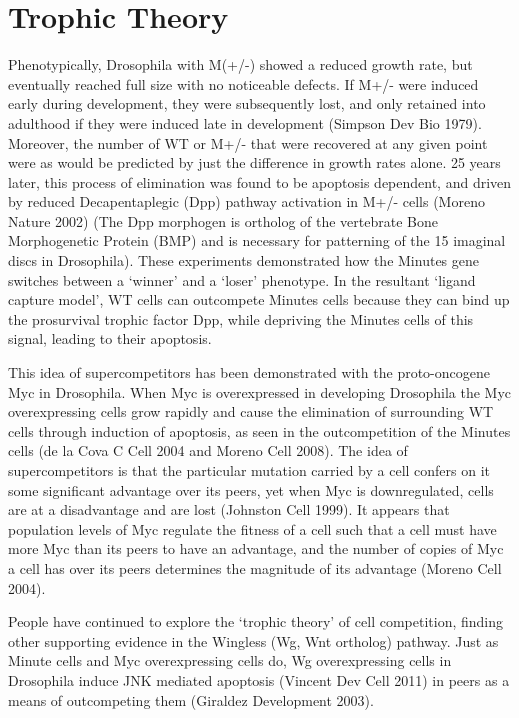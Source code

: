 \documentclass[]{book}
\begin{document}
\section{Trophic Theory}\label{trophic-theory}

Phenotypically, Drosophila with M(+/-) showed a reduced growth rate, but
eventually reached full size with no noticeable defects. If M+/- were
induced early during development, they were subsequently lost, and only
retained into adulthood if they were induced late in development
(Simpson Dev Bio 1979). Moreover, the number of WT or M+/- that were
recovered at any given point were as would be predicted by just the
difference in growth rates alone. 25 years later, this process of
elimination was found to be apoptosis dependent, and driven by reduced
Decapentaplegic (Dpp) pathway activation in M+/- cells (Moreno Nature
2002) (The Dpp morphogen is ortholog of the vertebrate Bone
Morphogenetic Protein (BMP) and is necessary for patterning of the 15
imaginal discs in Drosophila). These experiments demonstrated how the
Minutes gene switches between a `winner' and a `loser' phenotype. In the
resultant `ligand capture model', WT cells can outcompete Minutes cells
because they can bind up the prosurvival trophic factor Dpp, while
depriving the Minutes cells of this signal, leading to their apoptosis.

This idea of supercompetitors has been demonstrated with the
proto-oncogene Myc in Drosophila. When Myc is overexpressed in
developing Drosophila the Myc overexpressing cells grow rapidly and
cause the elimination of surrounding WT cells through induction of
apoptosis, as seen in the outcompetition of the Minutes cells (de la
Cova C Cell 2004 and Moreno Cell 2008). The idea of supercompetitors is
that the particular mutation carried by a cell confers on it some
significant advantage over its peers, yet when Myc is downregulated,
cells are at a disadvantage and are lost (Johnston Cell 1999). It
appears that population levels of Myc regulate the fitness of a cell
such that a cell must have more Myc than its peers to have an advantage,
and the number of copies of Myc a cell has over its peers determines the
magnitude of its advantage (Moreno Cell 2004).

People have continued to explore the `trophic theory' of cell
competition, finding other supporting evidence in the Wingless (Wg, Wnt
ortholog) pathway. Just as Minute cells and Myc overexpressing cells do,
Wg overexpressing cells in Drosophila induce JNK mediated apoptosis
(Vincent Dev Cell 2011) in peers as a means of outcompeting them
(Giraldez Development 2003).
\end{document}
